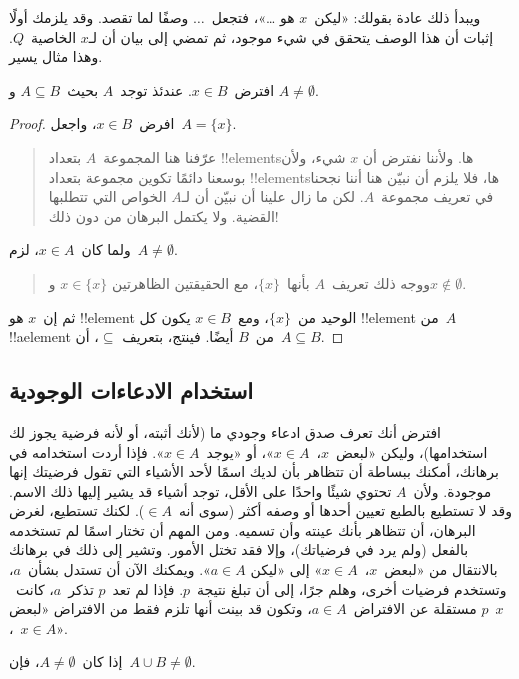 \documentclass[../../../include/open-logic-section]{subfiles}
\begin{document}
ويبدأ ذلك عادة بقولك: «ليكن~$x$ هو \dots»، فتجعل~$\dots$ وصفًا لما
تقصد. وقد يلزمك أولًا إثبات أن هذا الوصف يتحقق في شيء موجود، ثم تمضي
إلى بيان أن لـ$x$ الخاصية~$Q$. وهذا مثال يسير.

\begin{prop}
  افترض~$x \in B$. عندئذ توجد~$A$ بحيث~$A \subseteq B$ و
  $A \neq \emptyset$.
\end{prop}

\begin{proof}
  افرض~$x \in B$، واجعل~$A = \{x\}$.
  \begin{quote}
    عرّفنا هنا المجموعة~$A$ بتعداد !!{element}sها. ولأننا نفترض أن
    $x$ شيء، ولأن بوسعنا دائمًا تكوين مجموعة بتعداد !!{element}sها،
    فلا يلزم أن نبيّن هنا أننا نجحنا في تعريف مجموعة~$A$. لكن ما زال
    علينا أن نبيّن أن لـ$A$ الخواص التي تتطلبها القضية. ولا يكتمل
    البرهان من دون ذلك!{}
  \end{quote}
  ولما كان~$x \in A$، لزم~$A \neq \emptyset$.
  \begin{quote}
    ووجه ذلك تعريف~$A$ بأنها~$\{x\}$، مع الحقيقتين الظاهرتين
    $x \in \{x\}$ و$x \notin \emptyset$.
  \end{quote}
  ثم إن~$x$ هو !!{element} الوحيد من~$\{x\}$، ومع~$x \in B$ يكون كل
  !!{element} من~$A$ !!a{element} من~$B$ أيضًا. فينتج، بتعريف
  $\subseteq$، أن~$A \subseteq B$.
\end{proof}

\subsection{استخدام الادعاءات الوجودية}

افترض أنك تعرف صدق ادعاء وجودي ما (لأنك أثبته، أو لأنه فرضية يجوز لك
استخدامها)، وليكن «لبعض~$x$،~$x \in A$»، أو «يوجد~$x \in A$». فإذا
أردت استخدامه في برهانك، أمكنك ببساطة أن تتظاهر بأن لديك اسمًا لأحد
الأشياء التي تقول فرضيتك إنها موجودة. ولأن~$A$ تحتوي شيئًا واحدًا على
الأقل، توجد أشياء قد يشير إليها ذلك الاسم. وقد لا تستطيع بالطبع
تعيين أحدها أو وصفه أكثر (سوى أنه~$\in A$). لكنك تستطيع، لغرض
البرهان، أن تتظاهر بأنك عينته وأن تسميه. ومن المهم أن تختار اسمًا لم
تستخدمه بالفعل (ولم يرد في فرضياتك)، وإلا فقد تختل الأمور. وتشير إلى
ذلك في برهانك بالانتقال من «لبعض~$x$،~$x \in A$» إلى «ليكن
$a \in A$». ويمكنك الآن أن تستدل بشأن~$a$، وتستخدم فرضيات أخرى، وهلم
جرًا، إلى أن تبلغ نتيجة~$p$. فإذا لم تعد~$p$ تذكر~$a$، كانت~$p$
مستقلة عن الافتراض~$a \in A$، وتكون قد بينت أنها تلزم فقط من الافتراض
«لبعض~$x$،~$x \in A$».

\begin{prop}
إذا كان~$A \neq \emptyset$، فإن~$A \cup B \neq \emptyset$.
\end{prop}
\end{document}
